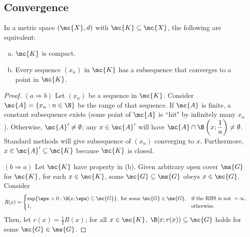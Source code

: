 \subsection{Convergence}
\begin{ntheorem}{}
	In a metric space \((\mc{X}, d)\) with \(\mc{K}\subseteq\mc{X}\), the following are equivalent:
	\begin{enumerate}[(a)]
		\item \(\mc{K}\) is compact.
		
		\item Every sequence \((x_n)\) in \(\mc{K}\) has a subsequence that converges to a point in \(\mc{K}\).
	\end{enumerate}
\end{ntheorem}

\begin{proof}
	\((a\Rightarrow b)\) Let \((x_n)\) be a sequence in \(\mc{K}\). Consider \(\mc{A}=\{x_n:n\in\N\}\) be the range of that sequence. If \(\mc{A}\) is finite, a constant subsequence exists (some point of \(\mc{A}\) is ``hit" by infinitely many \(x_n\)). Otherwise, \(\mc{A}'\neq\emptyset\); any \(x\in\mc{A}'\) will have \(\mc{A}\cap\B\left(x;\displaystyle\frac{1}{n}\right)\neq\emptyset\). Standard methods will give subsequence of \((x_n)\) converging to \(x\). Furthermore, \(x\in\mc{A}'\subseteq\mc{K}\) because \(\mc{K}\) is closed.
	
	\medskip
	
	\((b\Rightarrow a)\) Let \(\mc{K}\) have property in (b). Given arbitrary open cover \(\ms{G}\) for \(\mc{K}\), for each \(x\in\mc{K}\), some \(\mc{G}\subseteq\ms{G}\) obeys \(x\in\mc{G}\). Consider 
	\begin{equation*}
		R(x)=\begin{cases}
					\sup\{\eps>0:\B[x;\eps)\subseteq\mc{G}\},~\text{for some}~\mc{G}\in\ms{G},&\text{if the RHS is not}~+\infty.\\
					
					1,&\text{otherwise}.
				  \end{cases}
	\end{equation*}
	Then, let \(r(x)=\displaystyle\frac{1}{2}R(x)\); for all \(x\in\mc{K}\), \(\B[x;r(x))\subseteq\mc{G}\) holds for some \(\mc{G}\in\ms{G}\).
	
	\medskip
	

\end{proof}
